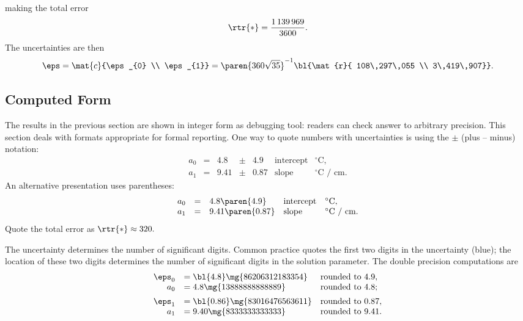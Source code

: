 making the total error
  \begin{equation*}
        \rtr{*} = \frac{1\,139\,969}{3600}.
  \end{equation*}
The uncertainties are then
  \begin{equation*}   %
    \eps = \mat{c}{\eps_{0} \\ \eps_{1}} = \paren{360 \sqrt{35}}^{-1} \bl{\mat{r}{ 108\,297\,055 \\ 3\,419\,907}}.
  \end{equation*}

\subsection{Computed Form}  %
The results in the previous section are shown in integer form as debugging tool: readers can check answer to arbitrary precision. This section deals with formats appropriate for formal reporting.
One way to quote numbers with uncertainties is using the $\pm$ (plus -- minus) notation:
  \begin{equation*}
    \begin{array}{rclclll}
      a_{0} & = & 4.8  & \pm & 4.9  & \text{intercept} & ^{\circ} \text{C} , \\
      a_{1} & = & 9.41 & \pm & 0.87 & \text{slope}     & ^{\circ} \text{C / cm} .
    \end{array}
    \label{eq:soln vector}
  \end{equation*}
An alternative presentation uses parentheses:
  \begin{equation*}
    \begin{array}{rclll}
      a_{0} & = & 4.8 \paren{4.9}   & \text{intercept} & ^{\circ} \text{C} , \\
      a_{1} & = & 9.41 \paren{0.87} & \text{slope}     & ^{\circ} \text{C / cm}.
    \end{array}
  \end{equation*}
Quote the total error as $\rtr{*} \approx 320.$

The uncertainty determines the number of significant digits. Common practice quotes the first two digits in the uncertainty (blue); the location of these two digits determines the number of significant digits in the solution parameter. The double precision computations are
  \begin{equation*}   %
    \begin{array}{rll}
      \eps_{0} &= \bl{4.8}\mg{86206312183354} & \text{rounded to 4.9}, \\
       a_{0}   &= 4.8\mg{13888888888889}  & \text{rounded to 4.8}; \\[5pt]
      \eps_{1} &= \bl{0.86}\mg{83016476563611} & \text{rounded to 0.87}, \\
       a_{1}   &= 9.40\mg{8333333333333}  & \text{rounded to 9.41}.
   \end{array}
  \end{equation*}


